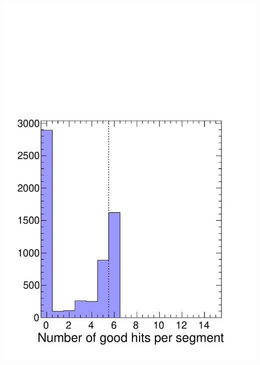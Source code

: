 \documentclass[compress]{beamer}
\begin{document}
\begin{frame}
\begin{columns}
\includegraphics[width=\linewidth]{tworuns_numhitsonseg.pdf}


\end{columns}
\end{frame}
\end{document}

